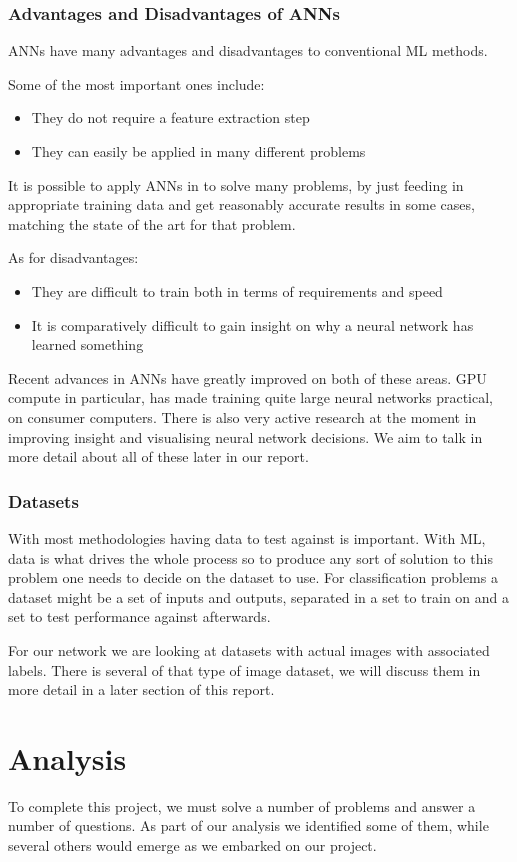 \subsubsection{Advantages and Disadvantages of ANNs}
ANNs have many advantages and disadvantages to conventional ML methods. 

Some of the most important ones include: 
\begin{itemize}
	\item They do not require a feature extraction step
	\item They can easily be applied in many different problems
\end{itemize}
It is possible to apply ANNs in to solve many problems, by just feeding in appropriate training data and get reasonably accurate results in some cases, matching the state of the art for that problem.

As for disadvantages:
\begin{itemize}
	\item They are difficult to train both in terms of requirements and speed
	\item It is comparatively difficult to gain insight on why a neural network has learned something
\end{itemize}
Recent advances in ANNs have greatly improved on both of these areas. GPU compute in particular, has made training quite large neural networks practical, on consumer computers. There is also very active research at the moment in improving insight and visualising neural network decisions. We aim to talk in more detail about all of these later in our report.

\subsubsection{Datasets}
With most methodologies having data to test against is important. With ML, data is what drives the whole process so to produce any sort of solution to this problem one needs to decide on the dataset to use. For classification problems a dataset might be a set of inputs and outputs, separated in a set to train on and a set to test performance against afterwards.

For our network we are looking at datasets with actual images with associated labels. There is several of that type of image dataset, we will discuss them in more detail in a later section of this report.

\section{Analysis}
To complete this project, we must solve a number of problems and answer a number of questions. As part of our analysis we identified some of them, while several others would emerge as we embarked on our project.

